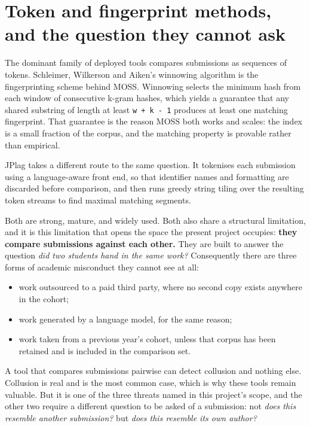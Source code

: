 \hypertarget{token-and-fingerprint-methods-and-the-question-they-cannot-ask}{%
\section{Token and fingerprint methods, and the question they cannot
ask}\label{token-and-fingerprint-methods-and-the-question-they-cannot-ask}}

The dominant family of deployed tools compares submissions as sequences
of tokens. Schleimer, Wilkerson and Aiken's winnowing algorithm
\cite{schleimer2003} is the fingerprinting scheme behind MOSS. Winnowing
selects the minimum hash from each window of consecutive k-gram hashes,
which yields a guarantee that any shared substring of length at least
\texttt{w\ +\ k\ -\ 1} produces at least one matching fingerprint. That
guarantee is the reason MOSS both works and scales: the index is a small
fraction of the corpus, and the matching property is provable rather
than empirical.

JPlag \cite{prechelt2002} takes a different route to the same question.
It tokenises each submission using a language-aware front end, so that
identifier names and formatting are discarded before comparison, and
then runs greedy string tiling over the resulting token streams to find
maximal matching segments.

Both are strong, mature, and widely used. Both also share a structural
limitation, and it is this limitation that opens the space the present
project occupies: \textbf{they compare submissions against each other.}
They are built to answer the question \emph{did two students hand in the
same work?} Consequently there are three forms of academic misconduct
they cannot see at all:

\begin{itemize}
\tightlist
\item
  work outsourced to a paid third party, where no second copy exists
  anywhere in the cohort;
\item
  work generated by a language model, for the same reason;
\item
  work taken from a previous year's cohort, unless that corpus has been
  retained and is included in the comparison set.
\end{itemize}

A tool that compares submissions pairwise can detect collusion and
nothing else. Collusion is real and is the most common case, which is
why these tools remain valuable. But it is one of the three threats
named in this project's scope, and the other two require a different
question to be asked of a submission: not \emph{does this resemble
another submission?} but \emph{does this resemble its own author?}

